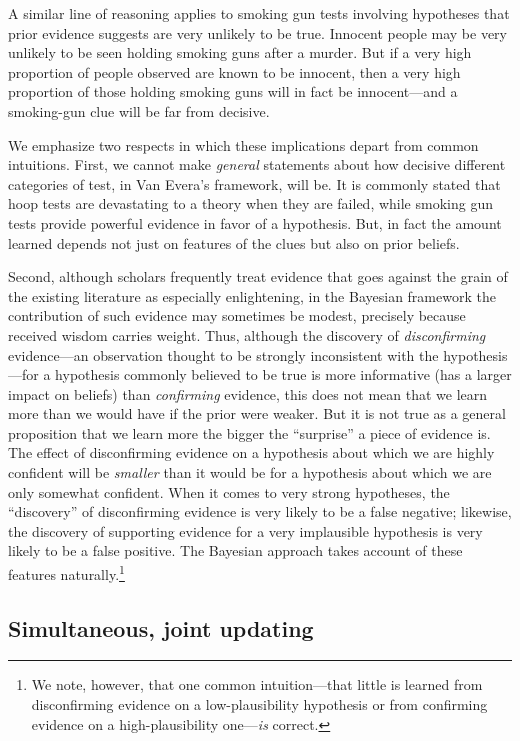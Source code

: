 \documentclass[
  12pt,
]{book}
\begin{document}
A similar line of reasoning applies to smoking gun tests involving hypotheses that prior evidence suggests are very unlikely to be true. Innocent people may be very unlikely to be seen holding smoking guns after a murder. But if a very high proportion of people observed are known to be innocent, then a very high proportion of those holding smoking guns will in fact be innocent---and a smoking-gun clue will be far from decisive.

We emphasize two respects in which these implications depart from common intuitions. First, we cannot make \emph{general} statements about how decisive different categories of test, in Van Evera's framework, will be. It is commonly stated that hoop tests are devastating to a theory when they are failed, while smoking gun tests provide powerful evidence in favor of a hypothesis. But, in fact the amount learned depends not just on features of the clues but also on prior beliefs.

Second, although scholars frequently treat evidence that goes against the grain of the existing literature as especially enlightening, in the Bayesian framework the contribution of such evidence may sometimes be modest, precisely because received wisdom carries weight. Thus, although the discovery of \emph{disconfirming} evidence---an observation thought to be strongly inconsistent with the hypothesis---for a hypothesis commonly believed to be true is more informative (has a larger impact on beliefs) than \emph{confirming} evidence, this does not mean that we learn more than we would have if the prior were weaker. But it is not true as a general proposition that we learn more the bigger the ``surprise'' a piece of evidence is. The effect of disconfirming evidence on a hypothesis about which we are highly confident will be \emph{smaller} than it would be for a hypothesis about which we are only somewhat confident. When it comes to very strong hypotheses, the ``discovery'' of disconfirming evidence is very likely to be a false negative; likewise, the discovery of supporting evidence for a very implausible hypothesis is very likely to be a false positive. The Bayesian approach takes account of these features naturally.\footnote{We note, however, that one common intuition---that little is learned from disconfirming evidence on a low-plausibility hypothesis or from confirming evidence on a high-plausibility one---\emph{is} correct.}

\hypertarget{simultaneous-joint-updating}{%
\subsection{Simultaneous, joint updating}\label{simultaneous-joint-updating}}
\end{document}
